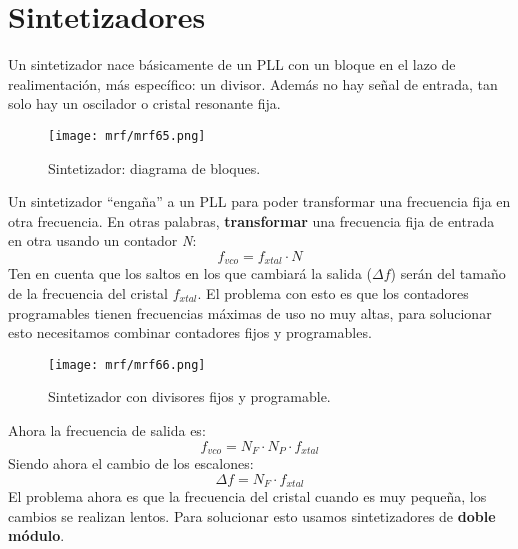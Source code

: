 \documentclass[
	12pt, %
	fleqn, %
	a4paper, %
	oneside, %
]{LegrandOrangeBook}
\begin{document}
\section{Sintetizadores}
Un sintetizador nace básicamente de un PLL con un bloque en el lazo de realimentación, más específico: un divisor. Además no hay señal de entrada, tan solo hay un oscilador o cristal resonante fija. 
\begin{figure}[H]
\centering
\texttt{[image: mrf/mrf65.png]}
\caption{Sintetizador: diagrama de bloques.}
\end{figure}
Un sintetizador ``engaña'' a un PLL para poder transformar una frecuencia fija en otra frecuencia. En otras palabras, \textbf{transformar} una frecuencia fija de entrada en otra usando un contador  \textit{N}:
\begin{equation}
f_{vco}=f_{xtal}\cdot N
\end{equation}
Ten en cuenta que los saltos en los que cambiará la salida ($\Delta f$) serán del tamaño de la frecuencia del cristal $f_{xtal}$. El problema con esto es que los contadores programables tienen frecuencias máximas de uso no muy altas, para solucionar esto necesitamos combinar contadores fijos y programables.
\begin{figure}[H]
\centering
\texttt{[image: mrf/mrf66.png]}
\caption{Sintetizador con divisores fijos y programable.}
\end{figure}
Ahora la frecuencia de salida es:
\begin{equation}
f_{vco}=N_F\cdot N_P\cdot f_{xtal}
\end{equation}
Siendo ahora el cambio de los escalones:
\begin{equation}
\Delta f=N_F\cdot f_{xtal}
\end{equation}
El problema ahora es que la frecuencia del cristal cuando es muy pequeña, los cambios se realizan lentos. Para solucionar esto usamos sintetizadores de \textbf{doble módulo}.
\end{document}
